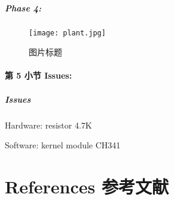 \documentclass[
    aspectratio=169,                   %
]{beamer}
\begin{document}
    \begin{frame}
        \frametitle{Phase 4: }
        \begin{figure}
            \centering
            \begin{stampbox}
                \texttt{[image: plant.jpg]}
            \end{stampbox}
            \caption{图片标题\cite{viman}}
        \end{figure}
    \end{frame}

\subsection{第 5 小节 Issues: }

    \begin{frame}
        \frametitle{Issues}

        \begin{block}{Hardware: resistor 4.7K}

        \end{block}

        \begin{block}{Software: kernel module CH341}

        \end{block}

    \end{frame}

        
        


\part{References 参考文献}
    \begin{frame}[allowframebreaks]
        \printbibliography[title=References 参考文献]    %
    \end{frame}

    \makebottom     %
\end{document}
